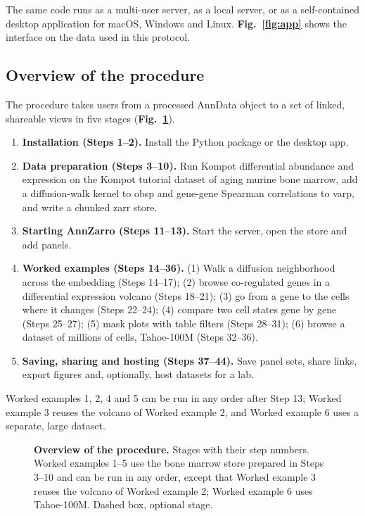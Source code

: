 The same code runs as a multi-user server, as a local server, or as a self-contained desktop application for macOS, Windows and Linux. \textbf{Fig.~\ref{fig:app}} shows the interface on the data used in this protocol. 

\figapp

\subsection{Overview of the procedure}

The procedure takes users from a processed AnnData object to a set of linked, shareable views in five stages (\textbf{Fig.~\ref{fig:procedure}}). 

\begin{enumerate}[nosep]
\item \textbf{Installation (Steps 1--2).} Install the Python package or the desktop app.
\item \textbf{Data preparation (Steps 3--10).} Run Kompot differential abundance and expression on the Kompot tutorial dataset of aging murine bone marrow, add a diffusion-walk kernel to obsp and gene-gene Spearman correlations to varp, and write a chunked zarr store.
\item \textbf{Starting AnnZarro (Steps 11--13).} Start the server, open the store and add panels.
\item \textbf{Worked examples (Steps 14--36).} (1) Walk a diffusion neighborhood across the embedding (Steps 14--17); (2) browse co-regulated genes in a differential expression volcano (Steps 18--21); (3) go from a gene to the cells where it changes (Steps 22--24); (4) compare two cell states gene by gene (Steps 25--27); (5) mask plots with table filters (Steps 28--31); (6) browse a dataset of millions of cells, Tahoe-100M (Steps 32--36).
\item \textbf{Saving, sharing and hosting (Steps 37--44).} Save panel sets, share links, export figures and, optionally, host datasets for a lab.
\end{enumerate}

Worked examples 1, 2, 4 and 5 can be run in any order after Step 13; Worked example 3 reuses the volcano of Worked example 2, and Worked example 6 uses a separate, large dataset.

\begin{figure}[t]
\centering

\caption{\textbf{Overview of the procedure.} Stages with their step numbers. Worked examples 1--5 use the bone marrow store prepared in Steps 3--10 and can be run in any order, except that Worked example 3 reuses the volcano of Worked example 2; Worked example 6 uses Tahoe-100M. Dashed box, optional stage.}
\label{fig:procedure}
\end{figure}

